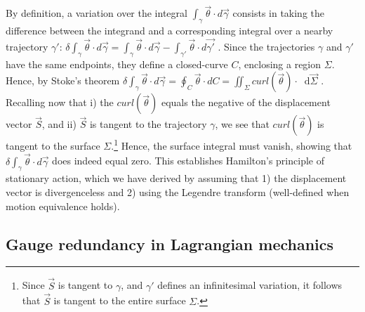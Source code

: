 \documentclass[letterpaper]{article}
\newcommand{\diff}{\mathop{}\!\mathrm{d}} %
\renewcommand{\vector}[1]{\ensuremath{\vec{#1}}} %
\newcommand{\integral}{\int}
\begin{document}
By definition, a variation over the integral $\integral_{\gamma} \vector{\theta} \cdot d\vector{\gamma}$ consists in taking the difference between the integrand and a corresponding integral over a nearby trajectory $\gamma'$: $\delta \integral_{\gamma} \vector{\theta} \cdot d\vector{\gamma} = \integral_{\gamma} \vector{\theta} \cdot d\vector{\gamma} - \integral_{\gamma'} \vector{\theta} \cdot d\vector{\gamma'}$ . Since the trajectories $\gamma$ and $\gamma'$ have the same endpoints, they define a closed-curve $C$, enclosing a region $\Sigma $. Hence, by Stoke's theorem $\delta \integral_{\gamma} \vector{\theta} \cdot d\vector{\gamma} = \oint_{C} \vector{\theta}  \cdot dC = \iint_{\Sigma} curl(\vector{\theta}) \cdot \diff \vector{\Sigma}$ . Recalling now that i) the $curl(\vector{\theta})$ equals the negative of the displacement vector $\vector{S}$, and ii)  $\vector{S}$ is tangent to the trajectory $\gamma $, we see that $curl(\vector{\theta})$ is tangent to the surface $\Sigma $.\footnote{Since $\vector{S}$ is tangent to $\gamma $, and $\gamma'$ defines an infinitesimal variation, it follows that $\vector{S}$ is tangent to the entire surface $\Sigma $.} Hence, the surface integral must vanish, showing that $\delta \integral_{\gamma} \vector{\theta} \cdot d\vector{\gamma}$ does indeed equal zero. This establishes Hamilton's principle of stationary action, which we have derived by assuming that 1) the displacement vector is divergenceless and 2) using the Legendre transform (well-defined when motion equivalence holds).



\subsection{Gauge redundancy in Lagrangian mechanics}
\label{gauge}
\end{document}
